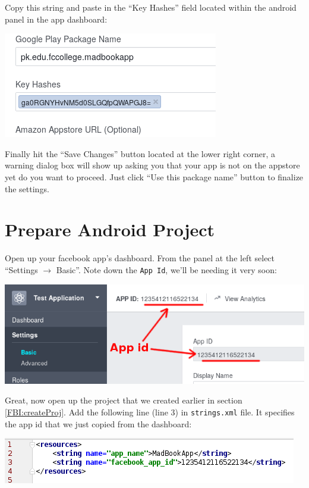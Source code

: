 Copy this string and paste in the ``Key Hashes'' field located within the android panel in the app dashboard:

\begin{center}
	\includegraphics[scale=\SourceCodeScale]{chapters/ch12/images/8}
\end{center}

Finally hit the ``Save Changes'' button located at the lower right corner, a warning dialog box will show up asking you that your app is not on the appstore yet do you want to proceed. Just click ``Use this package name'' button to finalize the settings.

\section{Prepare Android Project}

Open up your facebook app's dashboard. From the panel at the left select ``Settings $\rightarrow$ Basic''. Note down the \texttt{App Id}, we'll be needing it very soon:

\begin{center}
	\includegraphics[scale=\SourceCodeScale]{chapters/ch12/images/9}
\end{center}

Great, now open up the project that we created earlier in section \ref{FBI:createProj}. Add the following line (line 3) in \texttt{strings.xml} file. It specifies the app id that we just copied from the dashboard:

\begin{center}
	\includegraphics[scale=\SourceCodeScale]{chapters/ch12/images/10}
\end{center}

